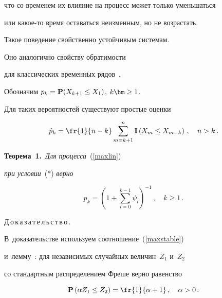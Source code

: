 что со временем их влияние на процесс может только уменьшаться


или ка\-кое-то время оставаться неизменным, но не возрастать.


Такое поведение свойственно устойчивым сис\-те\-мам.


Оно аналогично свойству обратимости


для классических временн$\acute{\mbox{ы}}$х рядов~\cite[гл.~3]{BJ}.





Обозначим $p_k={\bf P}(X_{k+1}\le X_1)$, $k\hm\ge 1$.


Для таких вероятностей существуют простые оценки


\begin{equation}\label{pk}


{\hat p}_k=\fr{1}{n-k}\sum\limits_{m=k+1}^n{\bf I}\left(X_m\le X_{m-k}\right)\,,


\quad n>k\,.


\end{equation}





\smallskip





\noindent


\textbf{Теорема~1.}\ \textit{Для процесса}~(\ref{maxlin}) 


\textit{при условии}~(*) \textit{верно}


$$p_k=\left(1+\sum\limits_{l=0}^{k-1}\psi_l\right)^{-1}\,,\quad k\ge 1\,.


$$








\noindent


Д\,о\,к\,а\,з\,а\,т\,е\,л\,ь\,с\,т\,в\,о\,.\ \ 


В~доказательстве используем соотношение~(\ref{maxstable})


и~лемму~\cite{Leb1}: для независимых случайных величин~$Z_1$ и~$Z_2$


со стандартным распределением Фреше верно равенство





\noindent


\begin{equation}


\label{lemo}


{\bf P}\left(\alpha Z_1\le Z_2\right)=\fr{1}{\alpha+1}\,,\quad \alpha>0\,.


\end{equation}





